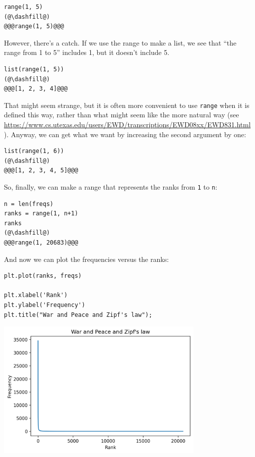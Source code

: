 \begin{lstlisting}[]
range(1, 5)
(@\dashfill@)
@@@range(1, 5)@@@
\end{lstlisting}

However, there's a catch. If we use the range to make a list, we see
that ``the range from 1 to 5'' includes 1, but it doesn't include 5.

\begin{lstlisting}[]
list(range(1, 5))
(@\dashfill@)
@@@[1, 2, 3, 4]@@@
\end{lstlisting}

That might seem strange, but it is often more convenient to use
\passthrough{\lstinline!range!} when it is defined this way, rather than
what might seem like the more natural way (see
\url{https://www.cs.utexas.edu/users/EWD/transcriptions/EWD08xx/EWD831.html}).
Anyway, we can get what we want by increasing the second argument by
one:

\begin{lstlisting}[]
list(range(1, 6))
(@\dashfill@)
@@@[1, 2, 3, 4, 5]@@@
\end{lstlisting}

So, finally, we can make a range that represents the ranks from
\passthrough{\lstinline!1!} to \passthrough{\lstinline!n!}:

\begin{lstlisting}[]
n = len(freqs)
ranks = range(1, n+1)
ranks
(@\dashfill@)
@@@range(1, 20683)@@@
\end{lstlisting}

And now we can plot the frequencies versus the ranks:

\begin{lstlisting}[]
plt.plot(ranks, freqs)

plt.xlabel('Rank')
plt.ylabel('Frequency')
plt.title("War and Peace and Zipf's law");
\end{lstlisting}

\begin{center}
\includegraphics[width=4in]{chapters/06_plotting_files/06_plotting_73_0.png}
\end{center}

